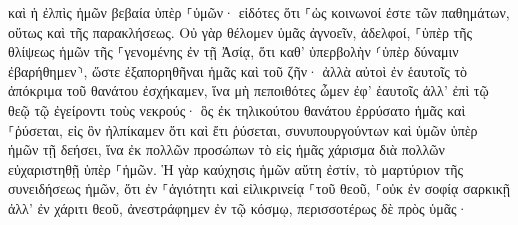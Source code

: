 \documentclass{openreader}
\begin{document}
καὶ ἡ ἐλπὶς ἡμῶν βεβαία ὑπὲρ ⸀ὑμῶν· εἰδότες ὅτι ⸀ὡς κοινωνοί ἐστε τῶν παθημάτων, οὕτως καὶ τῆς παρακλήσεως. 
Οὐ γὰρ θέλομεν ὑμᾶς ἀγνοεῖν, ἀδελφοί, ⸀ὑπὲρ τῆς θλίψεως ἡμῶν τῆς ⸀γενομένης ἐν τῇ Ἀσίᾳ, ὅτι καθ’ ὑπερβολὴν ⸂ὑπὲρ δύναμιν ἐβαρήθημεν⸃, ὥστε ἐξαπορηθῆναι ἡμᾶς καὶ τοῦ ζῆν· 
ἀλλὰ αὐτοὶ ἐν ἑαυτοῖς τὸ ἀπόκριμα τοῦ θανάτου ἐσχήκαμεν, ἵνα μὴ πεποιθότες ὦμεν ἐφ’ ἑαυτοῖς ἀλλ’ ἐπὶ τῷ θεῷ τῷ ἐγείροντι τοὺς νεκρούς· 
ὃς ἐκ τηλικούτου θανάτου ἐρρύσατο ἡμᾶς καὶ ⸀ῥύσεται, εἰς ὃν ἠλπίκαμεν ὅτι καὶ ἔτι ῥύσεται, 
συνυπουργούντων καὶ ὑμῶν ὑπὲρ ἡμῶν τῇ δεήσει, ἵνα ἐκ πολλῶν προσώπων τὸ εἰς ἡμᾶς χάρισμα διὰ πολλῶν εὐχαριστηθῇ ὑπὲρ ⸀ἡμῶν. 
Ἡ γὰρ καύχησις ἡμῶν αὕτη ἐστίν, τὸ μαρτύριον τῆς συνειδήσεως ἡμῶν, ὅτι ἐν ⸀ἁγιότητι καὶ εἰλικρινείᾳ ⸀τοῦ θεοῦ, ⸀οὐκ ἐν σοφίᾳ σαρκικῇ ἀλλ’ ἐν χάριτι θεοῦ, ἀνεστράφημεν ἐν τῷ κόσμῳ, περισσοτέρως δὲ πρὸς ὑμᾶς· 
\end{document}
